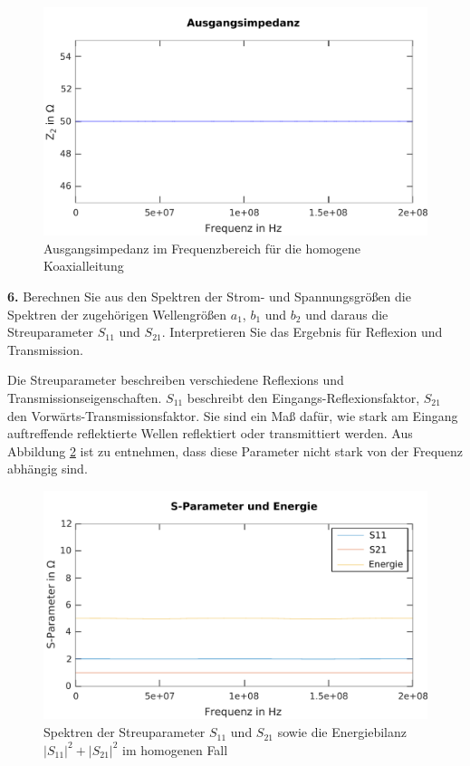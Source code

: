 \documentclass[Protokollheft.tex]{subfiles}
\begin{document}
\begin{figure}
	\centering
	\includegraphics[width=0.7\linewidth]{Ausgangsimpedanz}
	\caption{Ausgangsimpedanz im Frequenzbereich für die homogene Koaxialleitung}
	\label{fig:ausgangsimpedanz}
\end{figure}

\begin{framed}
	\noindent \textbf{6.} Berechnen Sie aus den Spektren der Strom- und 
Spannungsgrößen die Spektren der zugehörigen Wellengrößen $a_1$,
$b_1$ und $b_2$ und daraus die Streuparameter $S_{11}$ und
$S_{21}$. Interpretieren Sie das Ergebnis für Reflexion und
Transmission.\label{exer:calcWaveQuantities}
\end{framed}
\noindent
Die Streuparameter beschreiben verschiedene Reflexions und Transmissionseigenschaften. $S_{11}$ beschreibt den Eingangs-Reflexionsfaktor, $S_{21}$ den Vorwärts-Transmissionsfaktor. Sie sind ein Maß dafür, wie stark am Eingang auftreffende reflektierte Wellen reflektiert oder transmittiert werden. Aus Abbildung \ref{fig:sparameterenergie} ist zu entnehmen, dass diese Parameter nicht stark von der Frequenz abhängig sind.

\begin{figure}
	\centering
	\includegraphics[width=0.7\linewidth]{SParameterEnergie}
	\caption{Spektren der Streuparameter $S_{11}$ und $S_{21}$ sowie die Energiebilanz $|S_{11}|^2 + |S_{21}|^2$ im homogenen Fall}
	\label{fig:sparameterenergie}
\end{figure}
\end{document}
